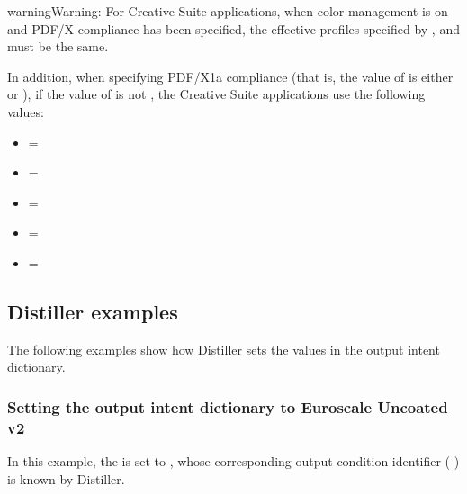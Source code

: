 \documentclass[letterpaper,12pt,english,openany,oneside]{sphinxmanual}
\begin{document}
\begin{sphinxadmonition}{warning}{Warning:}
For Creative Suite applications, when color management is on and PDF/X compliance has been specified, the effective profiles specified by  ,  and  must be the same.
\end{sphinxadmonition}

In addition, when specifying PDF/X\sphinxhyphen{}1a compliance (that is, the value of  is either \sphinxcode{\sphinxupquote{{[}PDFX1a:2001{]}}} or \sphinxcode{\sphinxupquote{{[}PDFX1a:2003{]}}} ), if the value of  is not  , the Creative Suite applications use the following values:
\begin{itemize}
\item {} 
 = 

\item {} 
 = 

\item {} 
 = 

\item {} 
 = 

\item {} 
 = 

\end{itemize}


\subsection{Distiller examples}
\label{\detokenize{PDF_Create_UsingSettings:distiller-examples}}
The following examples show how Distiller sets the values in the output intent dictionary.


\subsubsection{Setting the output intent dictionary to Euroscale Uncoated v2}
\label{\detokenize{PDF_Create_UsingSettings:setting-the-output-intent-dictionary-to-euroscale-uncoated-v2}}
In this example, the  is set to  , whose corresponding output condition identifier ( ) is known by Distiller.
\end{document}
